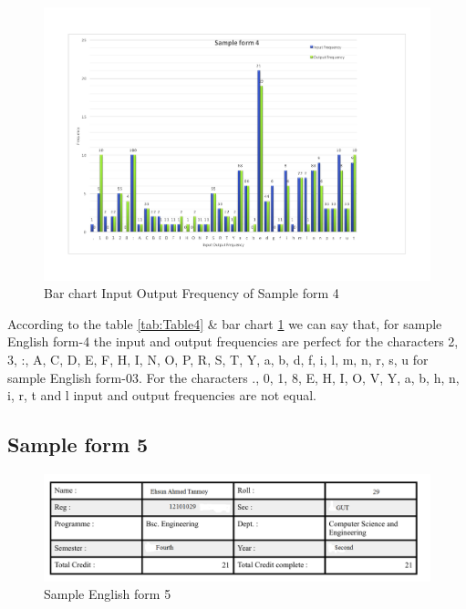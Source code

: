 \begin{figure}[H]
\centering
\includegraphics[width=1\textwidth]{form4.pdf}
\caption {Bar chart Input Output Frequency of Sample form 4}
\label {fig:bar4}
\end{figure}

According to the table \ref{tab:Table4} \& bar chart \ref{fig:bar4} we can say that, for sample English form-4 the input and output frequencies are perfect for the characters 2, 3, :, A, C, D, E, F, H, I, N, O, P, R, S, T, Y, a, b, d, f, i, l, m, n, r, s, u for sample English form-03. For the characters ., 0, 1, 8, E, H, I, O, V, Y, a, b, h, n, i, r, t and l input and output frequencies are not equal. 

\subsection{Sample form 5}
\begin{figure}[H]
\centering
\includegraphics[width=1\textwidth]{form5.png}
\caption {Sample English form 5}
\label {fig:form4}
\end{figure}

